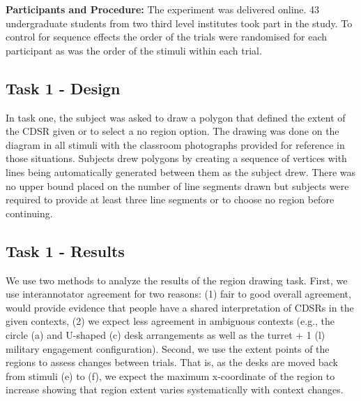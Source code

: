 \documentclass[11pt,letterpaper]{article}
\begin{document}
\textbf{Participants and Procedure:} The experiment was delivered online. 43 undergraduate students from two third level institutes took part in the study. To control for sequence effects the order of the trials were randomised for each participant as was the order of the stimuli within each trial.   

\subsection{Task 1 - Design}
In task one, the subject was asked to draw a polygon that defined the extent of the CDSR given or to select a no region option.  The drawing was done on the diagram in all stimuli with the classroom photographs provided for reference in those situations.  Subjects drew polygons by creating a sequence of vertices with lines being automatically generated between them as the subject drew.  There was no upper bound placed on the number of line segments drawn but subjects were required to provide at least three line segments or to choose no region before continuing.

\subsection{Task 1 - Results}
We use two methods to analyze the results of the region drawing task.  First, we use interannotator agreement for two reasons: (1) fair to good overall agreement, would provide evidence that people have a shared interpretation of CDSRs in the given contexts, (2) we expect less agreement in ambiguous contexts (e.g., the circle (a) and U-shaped (c) desk arrangements as well as the turret + 1 (l) military engagement configuration).  Second, we use the extent points of the regions to assess changes between trials.  That is, as the desks are moved back from stimuli (e) to (f), we expect the maximum x-coordinate of the region to increase showing that region extent varies systematically with context changes.

\end{document}
